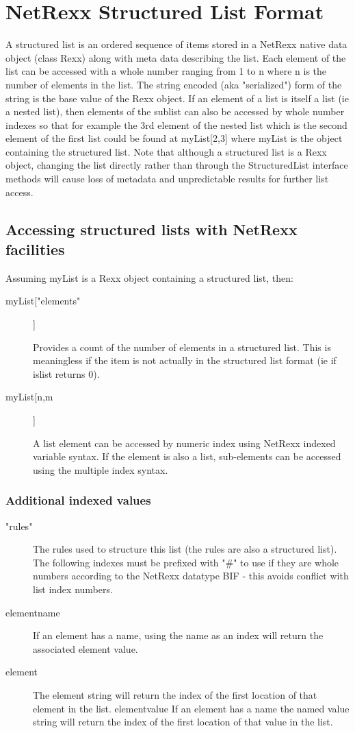 \section{NetRexx Structured List Format}
A structured list is an ordered sequence of items stored in a NetRexx
native data object (class Rexx) along with meta data describing the
list. Each element of the list can be accessed with a whole number
ranging from 1 to n where n is the number of elements in the list. The
string encoded (aka "serialized") form of the string is the base value
of the Rexx object. If an element of a list is itself a list (ie a
nested list), then elements of the sublist can also be accessed by
whole number indexes so that for example the 3rd element of the nested
list which is the second element of the first list could be found at
myList[2,3] where myList is the object containing the structured
list. Note that although a structured list is a Rexx object, changing
the list directly rather than through the StructuredList interface
methods will cause loss of metadata and unpredictable results for
further list access.

\subsection{Accessing structured lists with NetRexx facilities}
Assuming myList is a Rexx object containing a structured list, then:
\begin{description}


\item[myList["elements"]]

Provides a count of the number of elements in a structured list. This is meaningless if the item is not actually in the structured list format (ie if islist returns 0). 

\item[myList[n,m]]

A list element can be accessed by numeric index using NetRexx indexed variable syntax. If the element is also a list, sub-elements can be accessed using the multiple index syntax.
\end{description}

\subsubsection{Additional indexed values}
\begin{description}
\item["rules"]
The rules used to structure this list (the rules are also a structured list).
The following indexes must be prefixed with "\#" to use if they are whole numbers according to the NetRexx datatype BIF - this avoids conflict with list index numbers.
\item[elementname]
If an element has a name, using the name as an index will return the associated element value.

\item[element]
The element string will return the index of the first location of that element in the list.
elementvalue
If an element has a name the named value string will return the index of the first location of that value in the list.
\end{description}


